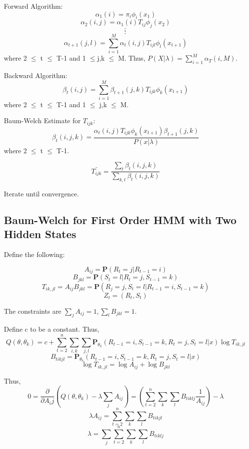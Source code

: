 \documentclass{article} %
\begin{document}
Forward Algorithm: \newline
$$\alpha_1(i) = \pi_i \phi_i(x_1)$$
$$\alpha_2(i,j) = \alpha_1(i) T_{ij} \phi_j(x_2)$$
$$:$$
$$:$$
$$\alpha_{t+1}(j, l) = \sum_{i=1}^M \alpha_t(i,j) T_{ijl} \phi_l(x_{t+1})$$
where 2 $\leq$ t $\leq$ T-1 and 1 $\leq$j,k $\leq$  M. \newline
Thus, $P(X | \lambda) = \sum_{i=1}^M \alpha_T(i,M)$. \newline

Backward Algorithm: \newline
$$\beta_t(i,j) = \sum_{i=1}^M \beta_{t+1}(j,k) T_{ijk} \phi_k(x_{t+1})$$
where 2 $\leq$ t $\leq$ T-1 and 1 $\leq$ j,k $\leq$ M. \newline

Baum-Welch Estimate for $T_{ijk}$: \newline
$$\beta_t(i,j,k) = \frac{\alpha_t(i,j) T_{ijk} \phi_k(x_{t+1}) \beta_{t+1}(j,k)}{P(x|\lambda)}$$ 
where 2 $\leq$ t $\leq$ T-1. \newline

$$\bar{T_{ijk}} = \frac{\sum_t \beta_t (i,j,k)}{\sum_{k,t} \beta_t (i,j,k)}$$

Iterate until convergence. 

\subsection{Baum-Welch for First Order HMM with Two Hidden States}
\label{3rdHMM}
Define the following:

$$A_{ij} = \textbf{P} (R_t = j | R_{t-1} = i)$$
$$B_{jkl} = \textbf{P} (S_t = l | R_t = j, S_{t-1} = k)$$ 
$$T_{ik, jl} = A_{ij} B_{jkl} = \textbf{P} (R_j = j, S_t = l | R_{t-1} = i, S_{t-1} = k)$$
$$Z_t = (R_t, S_t)$$

The constraints are $\sum_j A_{ij} = 1, \sum_l B_{jkl} = 1.$ \newline

Define c to be a constant. Thus,  \newline
$$Q(\theta, \theta_k) = c + \sum_{t=2}^n \sum_{i,k} \sum_{j,l} \textbf{P}_{\theta_k} (R_{t-1} = i, S_{t-1} = k, R_t = j, S_t = l | x) \log T_{ik, jl}$$ 
$$B_{tikjl} = \textbf{P}_{\theta_k} (R_{t-1} = i, S_{t-1} = k, R_t = j, S_t = l | x)$$
$$\log T_{ik, jl} = \log A_{ij} + \log B_{jkl}$$

Thus, \newline
$$ 0 = \frac{\partial}{\partial A_ij}(Q(\theta, \theta_k) - \lambda \sum_{j} A_{ij}) = (\sum_{t=2}^n \sum_k \sum_l B_{tiklj} \frac{1}{A_{ij}}) - \lambda$$
$$\lambda A_{ij} = \sum_{t=2}^n \sum_k \sum_l B_{tikjl}$$
$$\lambda = \sum_j \sum_{t=2}^n \sum_k \sum_l B_{tiklj}$$
\end{document}
